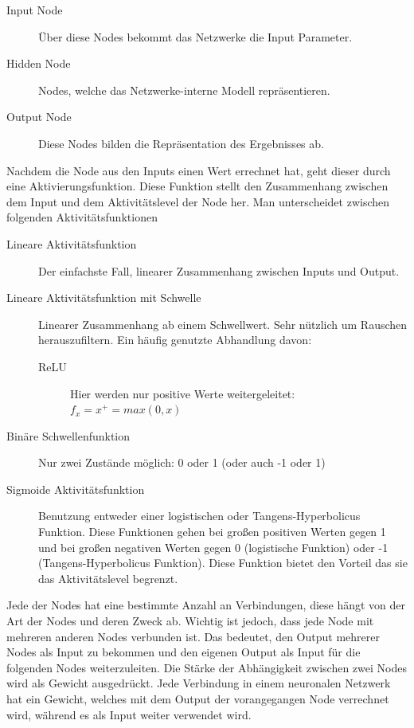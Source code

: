 \documentclass[pdftex,a4paper,halfparskip, article]{scrartcl}
\begin{document}
\begin{description}
	\item[Input Node] Über diese Nodes bekommt das Netzwerke die Input Parameter.
	\item[Hidden Node] Nodes, welche das Netzwerke-interne Modell repräsentieren.
	\item[Output Node] Diese Nodes bilden die Repräsentation des Ergebnisses ab.
\end{description}

Nachdem die Node aus den Inputs einen Wert errechnet hat, geht dieser durch eine Aktivierungsfunktion. Diese Funktion stellt den Zusammenhang zwischen dem Input und dem Aktivitätslevel der Node her. Man unterscheidet zwischen folgenden Aktivitätsfunktionen

\begin{description}
	\item[Lineare Aktivitätsfunktion] Der einfachste Fall, linearer Zusammenhang zwischen Inputs und Output.
	\item[Lineare Aktivitätsfunktion mit Schwelle] Linearer Zusammenhang ab einem Schwellwert. Sehr nützlich um Rauschen herauszufiltern. Ein häufig genutzte Abhandlung davon:
	\begin{description}
		\item[ReLU] Hier werden nur positive Werte weitergeleitet: \(f_x = x^+ = max(0,x) \)
	\end{description}
	\item[Binäre Schwellenfunktion] Nur zwei Zustände möglich: 0 oder 1 (oder auch -1 oder 1)
	\item[Sigmoide Aktivitätsfunktion] Benutzung entweder einer logistischen oder Tangens-Hyperbolicus Funktion. Diese Funktionen gehen bei großen positiven Werten gegen 1 und bei großen negativen Werten gegen 0 (logistische Funktion) oder -1 (Tangens-Hyperbolicus Funktion). Diese Funktion bietet den Vorteil das sie das Aktivitätslevel begrenzt.
\end{description} 

Jede der Nodes hat eine bestimmte Anzahl an Verbindungen, diese hängt von der Art der Nodes und deren Zweck ab. Wichtig ist jedoch, dass jede Node mit mehreren anderen Nodes verbunden ist. Das bedeutet, den Output mehrerer Nodes als Input zu bekommen und den eigenen Output als Input für die folgenden Nodes weiterzuleiten. Die Stärke der Abhängigkeit zwischen zwei Nodes wird als Gewicht ausgedrückt. Jede Verbindung in einem neuronalen Netzwerk hat ein Gewicht, welches mit dem Output der vorangegangen Node verrechnet wird, während es als Input weiter verwendet wird.
\end{document}
